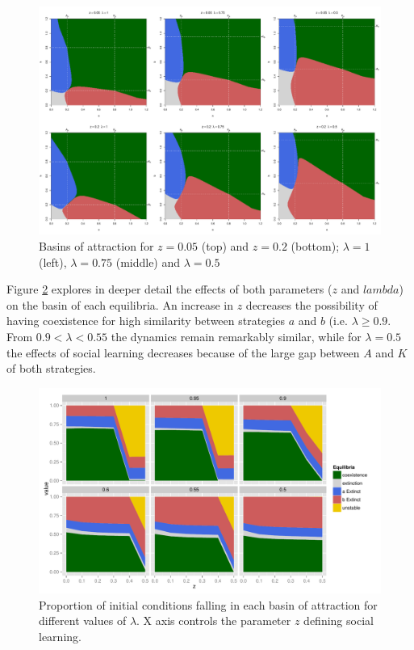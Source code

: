 \documentclass[3p,authoryear,twocolumn]{elsarticle} %
\begin{document}
\begin{figure}
  \centering
      \includegraphics[width=\textwidth]{./figures/figure5}
  \caption{Basins of attraction for $z=0.05$ (top) and $z=0.2$ (bottom); $\lambda=1$ (left), $\lambda=0.75$ (middle) and $\lambda=0.5$}
    \label{fig:overlap}
\end{figure}

Figure \ref{fig:percentages} explores in deeper detail the effects of both parameters ($z$ and $lambda$) on the basin of each equilibria. An increase in $z$ decreases the possibility of having coexistence for high similarity between strategies $a$ and $b$ (i.e. $\lambda \geq 0.9$. From $0.9 < \lambda < 0.55$ the dynamics remain remarkably similar, while for $\lambda = 0.5$ the effects of social learning decreases because of the large gap between $A$ and $K$ of both strategies.

\begin{figure}
  \centering
      \includegraphics[width=\textwidth]{./figures/figure6}
  \caption{Proportion of initial conditions falling in each basin of attraction for different values of $\lambda$. X axis controls the parameter $z$ defining social learning.} %
    \label{fig:percentages}
\end{figure}
\end{document}
